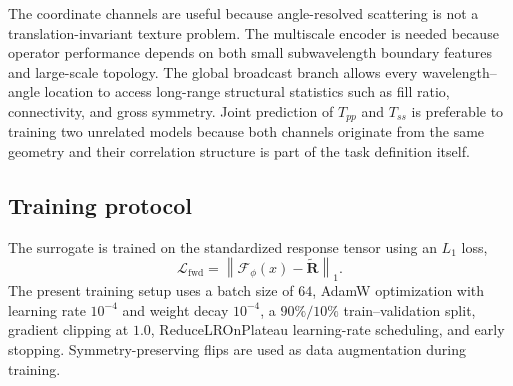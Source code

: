\documentclass[10pt,a4paper]{article}
\newcommand{\tp}{T_{pp}}
\newcommand{\ts}{T_{ss}}
\newcommand{\loss}{\mathcal{L}}
\begin{document}
The coordinate channels are useful because angle-resolved scattering is not a translation-invariant texture problem. The multiscale encoder is needed because operator performance depends on both small subwavelength boundary features and large-scale topology. The global broadcast branch allows every wavelength--angle location to access long-range structural statistics such as fill ratio, connectivity, and gross symmetry. Joint prediction of $\tp$ and $\ts$ is preferable to training two unrelated models because both channels originate from the same geometry and their correlation structure is part of the task definition itself.

\subsection{Training protocol}

The surrogate is trained on the standardized response tensor using an $L_1$ loss,
\begin{equation}
\loss_{\mathrm{fwd}}=\left\|\mathcal{F}_{\phi}(x)-\widetilde{\mathbf{R}}\right\|_1.
\end{equation}
The present training setup uses a batch size of $64$, AdamW optimization with learning rate $10^{-4}$ and weight decay $10^{-4}$, a $90\%/10\%$ train--validation split, gradient clipping at $1.0$, ReduceLROnPlateau learning-rate scheduling, and early stopping. Symmetry-preserving flips are used as data augmentation during training.
\end{document}
